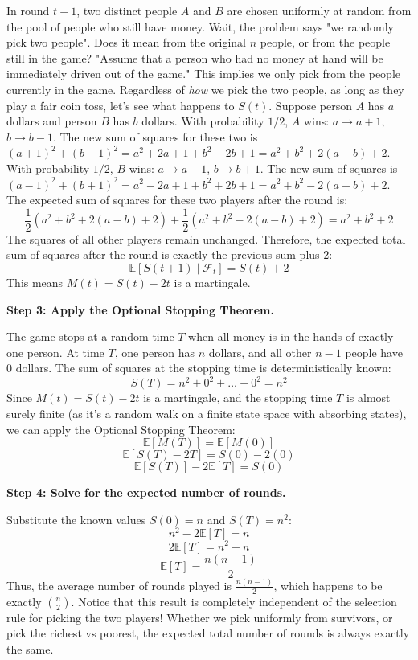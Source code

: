 \begin{solution}
In round $t+1$, two distinct people $A$ and $B$ are chosen uniformly at random from the pool of people who still have money. 
Wait, the problem says "we randomly pick two people". Does it mean from the original $n$ people, or from the people still in the game? 
"Assume that a person who had no money at hand will be immediately driven out of the game." This implies we only pick from the people currently in the game.
Regardless of \textit{how} we pick the two people, as long as they play a fair coin toss, let's see what happens to $S(t)$.
Suppose person $A$ has $a$ dollars and person $B$ has $b$ dollars.
With probability $1/2$, $A$ wins: $a \to a+1$, $b \to b-1$.
The new sum of squares for these two is $(a+1)^2 + (b-1)^2 = a^2 + 2a + 1 + b^2 - 2b + 1 = a^2 + b^2 + 2(a-b) + 2$.
With probability $1/2$, $B$ wins: $a \to a-1$, $b \to b+1$.
The new sum of squares is $(a-1)^2 + (b+1)^2 = a^2 - 2a + 1 + b^2 + 2b + 1 = a^2 + b^2 - 2(a-b) + 2$.
The expected sum of squares for these two players after the round is:
\[ \frac{1}{2} (a^2 + b^2 + 2(a-b) + 2) + \frac{1}{2} (a^2 + b^2 - 2(a-b) + 2) = a^2 + b^2 + 2 \]
The squares of all other players remain unchanged.
Therefore, the expected total sum of squares after the round is exactly the previous sum plus 2:
\[ \mathbb{E}[S(t+1) \mid \mathcal{F}_t] = S(t) + 2 \]
This means $M(t) = S(t) - 2t$ is a martingale.

\textbf{Step 3: Apply the Optional Stopping Theorem.}

The game stops at a random time $T$ when all money is in the hands of exactly one person.
At time $T$, one person has $n$ dollars, and all other $n-1$ people have 0 dollars.
The sum of squares at the stopping time is deterministically known:
\[ S(T) = n^2 + 0^2 + \dots + 0^2 = n^2 \]
Since $M(t) = S(t) - 2t$ is a martingale, and the stopping time $T$ is almost surely finite (as it's a random walk on a finite state space with absorbing states), we can apply the Optional Stopping Theorem:
\[ \mathbb{E}[M(T)] = \mathbb{E}[M(0)] \]
\[ \mathbb{E}[S(T) - 2T] = S(0) - 2(0) \]
\[ \mathbb{E}[S(T)] - 2\mathbb{E}[T] = S(0) \]

\textbf{Step 4: Solve for the expected number of rounds.}

Substitute the known values $S(0) = n$ and $S(T) = n^2$:
\[ n^2 - 2\mathbb{E}[T] = n \]
\[ 2\mathbb{E}[T] = n^2 - n \]
\[ \mathbb{E}[T] = \frac{n(n-1)}{2} \]
Thus, the average number of rounds played is $\frac{n(n-1)}{2}$, which happens to be exactly $\binom{n}{2}$.
Notice that this result is completely independent of the selection rule for picking the two players! Whether we pick uniformly from survivors, or pick the richest vs poorest, the expected total number of rounds is always exactly the same.
\end{solution}

